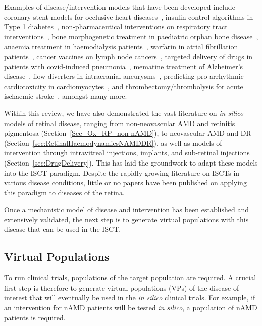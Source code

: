 \documentclass{article}
\begin{document}
Examples of disease/intervention models that have been developed include coronary stent models for occlusive heart diseases~\cite{Antonini2021, Berti2021}, insulin control algorithms in Type 1 diabetes~\cite{Kovatchev2009}, non-pharmaceutical interventions on respiratory tract interventions~\cite{Arsene2022}, bone morphogenetic treatment in paediatric orphan bone disease~\cite{Carlier2018}, anaemia treatment in haemodialysis patients~\cite{Fuertinger2018}, warfarin in atrial fibrillation patients~\cite{Ravvaz2017}, cancer vaccines on lymph node cancers~\cite{Gaffney2022}, targeted delivery of drugs in patients with covid-induced pneumonia~\cite{Wang2022}, mematine treatment of Alzheimer’s disease~\cite{Swietlik2022}, flow diverters in intracranial aneurysms~\cite{SarramiForoushani2021}, predicting pro-arrhythmic cardiotoxicity in cardiomyocytes~\cite{Passini2017}, and thrombectomy/thrombolysis for acute ischaemic stroke~\cite{Konduri2020}, amongst many more.

Within this review, we have also demonstrated the vast literature on \textit{in silico} models of retinal disease, ranging from non-neovascular AMD and retinitis pigmentosa (Section~\ref{Sec_Ox_RP_non-nAMD}), to neovascular AMD and DR (Section~\ref{sec:RetinalHaemodynamicsNAMDDR}), as well as models of intervention through intravitreal injections, implants, and sub-retinal injections (Section~\ref{sec:DrugDelivery}).
This has laid the groundwork to adapt these models into the ISCT paradigm. Despite the rapidly growing literature on ISCTs in various disease conditions, little or no papers have been published on applying this paradigm to diseases of the retina.

Once a mechanistic model of disease and intervention has been established and extensively validated, the next step is to generate virtual populations with this disease that can be used in the ISCT.

\subsection{Virtual Populations}

To run clinical trials, populations of the target population are required. A crucial first step is therefore to generate virtual populations (VPs) of the disease of interest that will eventually be used in the \textit{in silico} clinical trials. For example, if an intervention for nAMD patients will be tested \textit{in silico}, a population of nAMD patients is required.
\end{document}
